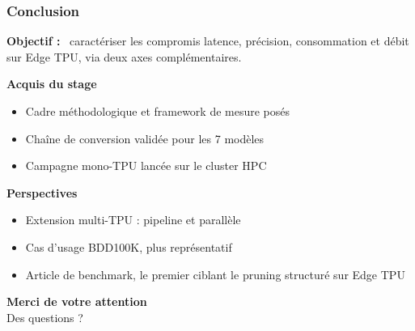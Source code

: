 \documentclass[
	11pt,
]{beamer}
\newcommand{\ititle}[1]{\textbf{#1 :}~}
\begin{document}
{
\begin{frame}
	\frametitle{Conclusion}

	\footnotesize
	\vspace{0.4em}
	\ititle{Objectif} caractériser les compromis latence, précision,
	consommation et débit sur Edge TPU, via deux axes complémentaires.

	\vspace{0.7em}
	\textbf{Acquis du stage}
	\begin{itemize}
		\item Cadre méthodologique et framework de mesure posés
		\item Chaîne de conversion validée pour les 7 modèles
		\item Campagne mono-TPU lancée sur le cluster HPC
	\end{itemize}

	\vspace{0.6em}
	\textbf{Perspectives}
	\begin{itemize}
		\item Extension multi-TPU : pipeline et parallèle
		\item Cas d'usage BDD100K, plus représentatif
		\item Article de benchmark, le premier ciblant le pruning
		      structuré sur Edge TPU
	\end{itemize}
\end{frame}
}
{
\begin{frame}
	\vfill
	\begin{center}
		{\Large\textbf{Merci de votre attention}}
		\\[1.2em]
		{\footnotesize Des questions ?}
	\end{center}
	\vfill
\end{frame}
}

\end{document}
